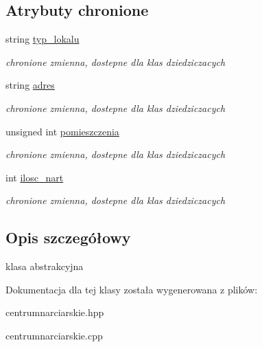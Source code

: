 \subsection*{Atrybuty chronione}
\begin{DoxyCompactItemize}
\item 
\mbox{\label{class_centrum_narciarskie_a671a12e1f05ad515f1d34674d475089b}} 
string \hyperlink{class_centrum_narciarskie_a671a12e1f05ad515f1d34674d475089b}{typ\+\_\+lokalu}
\begin{DoxyCompactList}\small\item\em chronione zmienna, dostepne dla klas dziedziczacych \end{DoxyCompactList}\item 
\mbox{\label{class_centrum_narciarskie_aeb2c143fb961e8a7a1ef5440bf47b22f}} 
string \hyperlink{class_centrum_narciarskie_aeb2c143fb961e8a7a1ef5440bf47b22f}{adres}
\begin{DoxyCompactList}\small\item\em chronione zmienna, dostepne dla klas dziedziczacych \end{DoxyCompactList}\item 
\mbox{\label{class_centrum_narciarskie_a8081f1fcecfec0e8052b8f600d5cdffd}} 
unsigned int \hyperlink{class_centrum_narciarskie_a8081f1fcecfec0e8052b8f600d5cdffd}{pomieszczenia}
\begin{DoxyCompactList}\small\item\em chronione zmienna, dostepne dla klas dziedziczacych \end{DoxyCompactList}\item 
\mbox{\label{class_centrum_narciarskie_a511c3165a1a1070534b60989ab9fe9a8}} 
int \hyperlink{class_centrum_narciarskie_a511c3165a1a1070534b60989ab9fe9a8}{ilosc\+\_\+nart}
\begin{DoxyCompactList}\small\item\em chronione zmienna, dostepne dla klas dziedziczacych \end{DoxyCompactList}\end{DoxyCompactItemize}


\subsection{Opis szczegółowy}
klasa abstrakcyjna 

Dokumentacja dla tej klasy została wygenerowana z plików\+:\begin{DoxyCompactItemize}
\item 
centrumnarciarskie.\+hpp\item 
centrumnarciarskie.\+cpp\end{DoxyCompactItemize}
